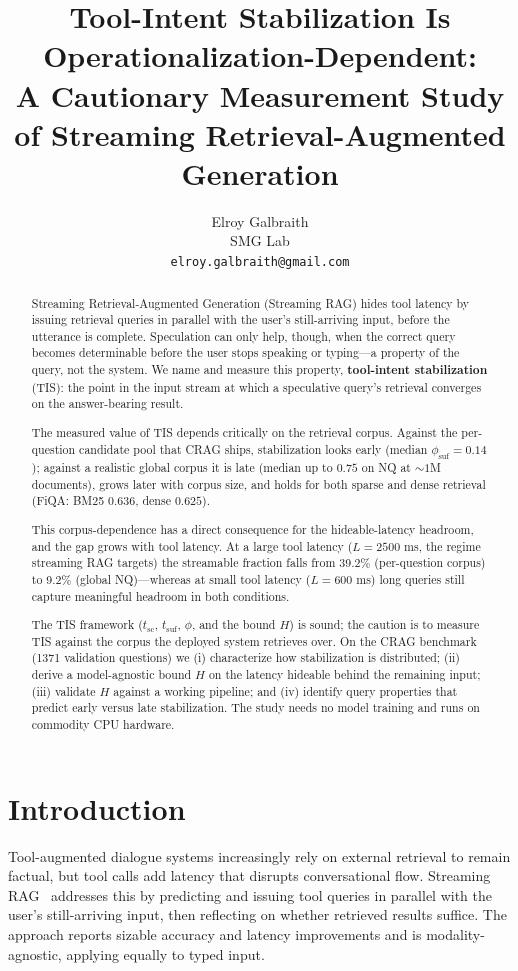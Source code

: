 \documentclass[11pt]{article}
\title{Tool-Intent Stabilization Is Operationalization-Dependent:\\
A Cautionary Measurement Study of Streaming Retrieval-Augmented Generation}
\author{Elroy Galbraith \\
  SMG Lab \\
  \texttt{elroy.galbraith@gmail.com}}
\renewcommand{\cite}{\citep}                         %
\newcommand{\nSplitZero}{1371}
\newcommand{\phiSufMed}{0.14}
\newcommand{\phiSufGnqOneM}{0.75}    %
\newcommand{\phiSufGfiqaBm}{0.636}   %
\newcommand{\phiSufGfiqaDe}{0.625}   %
\newcommand{\sfPqTwentyfive}{39.2\%} %
\newcommand{\sfNqTwentyfive}{9.2\%}  %
\begin{document}
\maketitle

\begin{abstract}
Streaming Retrieval-Augmented Generation (Streaming RAG) hides tool latency by
issuing retrieval queries in parallel with the user's still-arriving input, before
the utterance is complete. Speculation can only help, though, when the correct
query becomes determinable before the user stops speaking or typing---a property of
the query, not the system. We name and measure this property,
\textbf{tool-intent stabilization} (TIS): the point in the input stream at which a
speculative query's retrieval converges on the answer-bearing result.

The measured value of TIS depends critically on the retrieval corpus.
Against the per-question candidate pool that CRAG ships, stabilization looks early
(median $\phi_{\mathrm{suf}}=\phiSufMed$); against a realistic global corpus it is
late (median up to $\phiSufGnqOneM$ on NQ at ${\sim}1$M documents), grows later
with corpus size, and holds for both sparse and dense retrieval (FiQA: BM25
$\phiSufGfiqaBm$, dense $\phiSufGfiqaDe$).

This corpus-dependence has a direct consequence for the hideable-latency headroom,
and the gap grows with tool latency. At a large tool latency ($L{=}2500$ ms, the
regime streaming RAG targets) the streamable fraction falls from \sfPqTwentyfive{}
(per-question corpus) to \sfNqTwentyfive{} (global NQ)---whereas at small tool
latency ($L{=}600$ ms) long queries still capture meaningful headroom in both
conditions.

The TIS framework ($t_{\mathrm{sc}}$, $t_{\mathrm{suf}}$, $\phi$, and the bound
$H$) is sound; the caution is to measure TIS against the corpus the deployed system
retrieves over. On the CRAG benchmark (\nSplitZero{} validation questions) we
(i) characterize how stabilization is distributed; (ii) derive a model-agnostic
bound $H$ on the latency hideable behind the remaining input; (iii) validate $H$
against a working pipeline; and (iv) identify query properties that predict early
versus late stabilization. The study needs no model training and runs on commodity
CPU hardware.
\end{abstract}

\section{Introduction}
Tool-augmented dialogue systems increasingly rely on external retrieval to remain
factual, but tool calls add latency that disrupts conversational flow. Streaming
RAG~\cite{arora2025streamrag} addresses this by predicting and issuing tool
queries in parallel with the user's still-arriving input, then reflecting
on whether retrieved results suffice. The approach reports sizable accuracy and
latency improvements and is modality-agnostic, applying equally to typed input.
\end{document}
